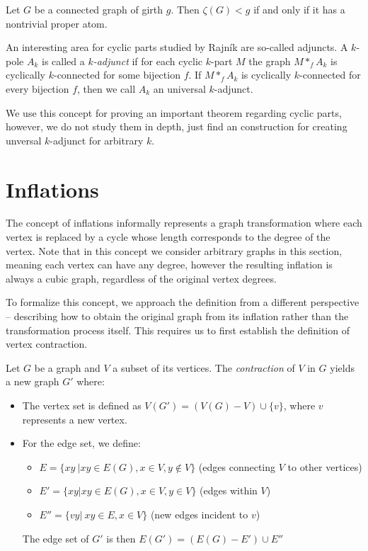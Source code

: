 \documentclass[12pt, twoside]{book}
\begin{document}
\begin{proposition}
	Let $G$ be a connected graph of girth $g$. Then $\zeta(G)<g$ if and only if it has a nontrivial proper atom.
\end{proposition}

An interesting area for cyclic parts studied by Rajník \cite{Rajnik_phd} are so-called adjuncts. A $k$-pole $A_k$ is called a \textit{$k$-adjunct} if for each cyclic $k$-part $M$ the graph $M*_f A_k$ is cyclically $k$-connected for some bijection $f$. If $M*_f A_k$ is cyclically $k$-connected for every bijection $f$, then we call $A_k$ an universal $k$-adjunct.

We use this concept for proving an important theorem regarding cyclic parts, however, we do not study them in depth, just find an construction for creating unversal $k$-adjunct for arbitrary $k$. 

\section{Inflations}\label{sec:inflations}

The concept of inflations informally represents a graph transformation where each vertex is replaced by a cycle whose length corresponds to the degree of the vertex. Note that in this concept we consider arbitrary graphs in this section, meaning each vertex can have any degree, however the resulting inflation is always a cubic graph, regardless of the original vertex degrees.

To formalize this concept, we approach the definition from a different perspective -- describing how to obtain the original graph from its inflation rather than the transformation process itself. This requires us to first establish the definition of vertex contraction.

Let $G$ be a graph and $V$ a subset of its vertices. The \textit{contraction} of $V$ in $G$ yields a new graph $G'$ where:
\begin{itemize}
	\item The vertex set is defined as $V(G') = (V(G)-V)\cup \{v\}$, where $v$ represents a new vertex.
	\item For the edge set, we define:
	\begin{itemize}
		\item $E=\{xy~|xy\in E(G), x\in V, y\notin V\}$ (edges connecting $V$ to other vertices)
		\item $E'=\{xy | xy\in E(G), x\in V, y\in V\}$ (edges within $V$)
		\item $E''=\{vy|~ xy\in E, x\in V\}$ (new edges incident to $v$)
	\end{itemize}
	
	The edge set of $G'$ is then ${E(G')=(E(G)-E')\cup E''}$
\end{itemize}
\end{document}
